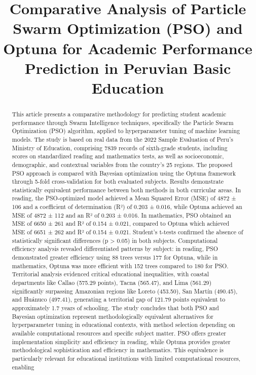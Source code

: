 \documentclass[conference]{IEEEtran}
\begin{document}
\title{Comparative Analysis of Particle Swarm Optimization (PSO) and Optuna for Academic Performance Prediction in Peruvian Basic Education}

\author{
}

\maketitle

\begin{abstract}
This article presents a comparative methodology for predicting student academic performance through Swarm Intelligence techniques, specifically the Particle Swarm Optimization (PSO) algorithm, applied to hyperparameter tuning of machine learning models. The study is based on real data from the 2022 Sample Evaluation of Peru's Ministry of Education, comprising 7839 records of sixth-grade students, including scores on standardized reading and mathematics tests, as well as socioeconomic, demographic, and contextual variables from the country's 25 regions. The proposed PSO approach is compared with Bayesian optimization using the Optuna framework through 5-fold cross-validation for both evaluated subjects. Results demonstrate statistically equivalent performance between both methods in both curricular areas. In reading, the PSO-optimized model achieved a Mean Squared Error (MSE) of 4872 ± 106 and a coefficient of determination (R²) of 0.203 ± 0.016, while Optuna achieved an MSE of 4872 ± 112 and an R² of 0.203 ± 0.016. In mathematics, PSO obtained an MSE of 6650 ± 261 and R² of 0.154 ± 0.021, compared to Optuna which achieved MSE of 6651 ± 262 and R² of 0.154 ± 0.021. Student's t-tests confirmed the absence of statistically significant differences (p > 0.05) in both subjects. Computational efficiency analysis revealed differentiated patterns by subject: in reading, PSO demonstrated greater efficiency using 88 trees versus 177 for Optuna, while in mathematics, Optuna was more efficient with 152 trees compared to 180 for PSO. Territorial analysis evidenced critical educational inequalities, with coastal departments like Callao (575.29 points), Tacna (565.47), and Lima (561.29) significantly surpassing Amazonian regions like Loreto (453.50), San Martín (490.45), and Huánuco (497.41), generating a territorial gap of 121.79 points equivalent to approximately 1.7 years of schooling. The study concludes that both PSO and Bayesian optimization represent methodologically equivalent alternatives for hyperparameter tuning in educational contexts, with method selection depending on available computational resources and specific subject matter. PSO offers greater implementation simplicity and efficiency in reading, while Optuna provides greater methodological sophistication and efficiency in mathematics. This equivalence is particularly relevant for educational institutions with limited computational resources, enabling 
\end{abstract}
\end{document}
